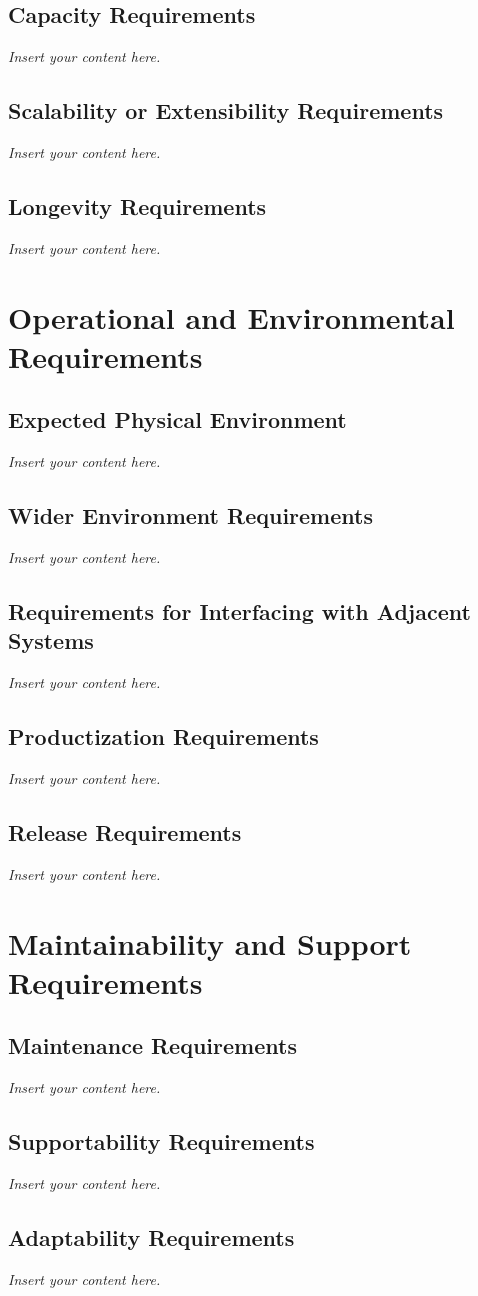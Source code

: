 \documentclass[12pt]{article}
\newcommand{\lips}{\textit{Insert your content here.}}
\begin{document}
\subsection{Capacity Requirements}
\lips
\subsection{Scalability or Extensibility Requirements}
\lips
\subsection{Longevity Requirements}
\lips

\section{Operational and Environmental Requirements}
\subsection{Expected Physical Environment}
\lips
\subsection{Wider Environment Requirements}
\lips
\subsection{Requirements for Interfacing with Adjacent Systems}
\lips
\subsection{Productization Requirements}
\lips
\subsection{Release Requirements}
\lips

\section{Maintainability and Support Requirements}
\subsection{Maintenance Requirements}
\lips
\subsection{Supportability Requirements}
\lips
\subsection{Adaptability Requirements}
\lips
\end{document}

